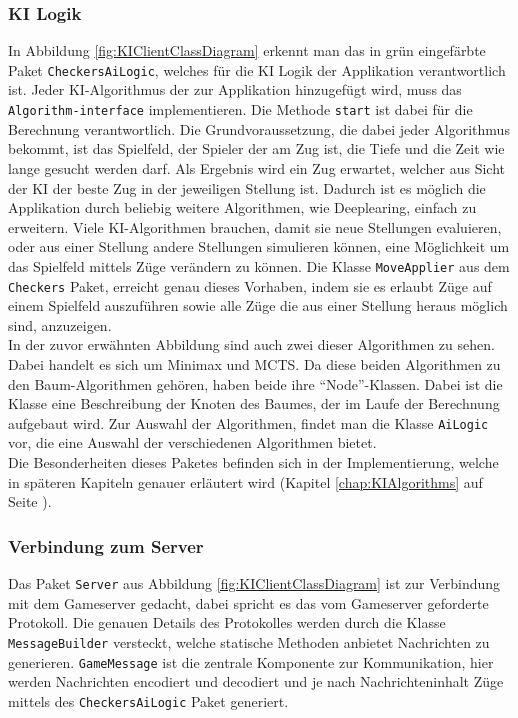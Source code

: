 \documentclass[12pt,a4paper,bibliography=totocnumbered,listof=totocnumbered]{article}
\begin{document}
\subsubsection{KI Logik}
In Abbildung \ref{fig:KIClientClassDiagram} erkennt man das in grün eingefärbte Paket \texttt{CheckersAiLogic}, welches für die KI Logik der Applikation verantwortlich ist.
Jeder KI-Algorithmus der zur Applikation hinzugefügt wird, muss das \texttt{Algorithm-interface} implementieren. Die Methode \texttt{start} ist dabei für die Berechnung 
verantwortlich. Die Grundvoraussetzung, die dabei jeder Algorithmus bekommt, ist das Spielfeld, der Spieler der am Zug ist, die Tiefe und die Zeit wie lange gesucht werden darf.
Als Ergebnis wird ein Zug erwartet, welcher aus Sicht der KI der beste Zug in der jeweiligen Stellung ist. Dadurch ist es möglich die Applikation durch beliebig weitere 
Algorithmen, wie Deeplearing, einfach zu erweitern. 
Viele KI-Algorithmen brauchen, damit sie neue Stellungen evaluieren, oder aus einer Stellung andere Stellungen simulieren können, eine Möglichkeit um das Spielfeld mittels 
Züge verändern zu können. Die Klasse \texttt{MoveApplier} aus dem \texttt{Checkers} Paket, erreicht genau dieses Vorhaben, indem sie es erlaubt Züge auf einem Spielfeld auszuführen 
sowie alle Züge die aus einer Stellung heraus möglich sind, anzuzeigen.
\\
In der zuvor erwähnten Abbildung sind auch zwei dieser Algorithmen zu sehen. Dabei handelt es sich um Minimax und MCTS. Da diese beiden Algorithmen zu den Baum-Algorithmen
gehören, haben beide ihre ``Node''-Klassen. Dabei ist die Klasse eine Beschreibung der Knoten des Baumes, der im Laufe der Berechnung aufgebaut wird.
Zur Auswahl der Algorithmen, findet man die Klasse \texttt{AiLogic} vor, die eine Auswahl der verschiedenen Algorithmen bietet. 
\\ 
Die Besonderheiten dieses Paketes befinden sich in der Implementierung, welche in späteren Kapiteln genauer erläutert wird 
(Kapitel \ref{chap:KIAlgorithms} auf Seite \pageref{chap:KIAlgorithms}).

\subsubsection{Verbindung zum Server}
Das Paket \texttt{Server} aus Abbildung \ref{fig:KIClientClassDiagram} ist zur Verbindung mit dem Gameserver gedacht, dabei spricht es das vom Gameserver geforderte 
Protokoll. Die genauen Details des Protokolles werden durch die Klasse \texttt{MessageBuilder} versteckt, welche statische Methoden anbietet Nachrichten zu generieren.
\texttt{GameMessage} ist die zentrale Komponente zur Kommunikation, hier werden Nachrichten encodiert und decodiert und je nach Nachrichteninhalt 
Züge mittels des \texttt{CheckersAiLogic} Paket generiert.
\end{document}
